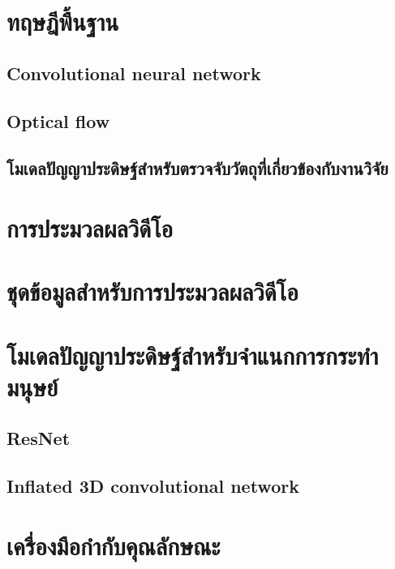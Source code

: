 \section{ทฤษฎีพื้นฐาน}
\subsection{Convolutional neural network}

\clearpage

\subsection{Optical flow}

\clearpage

\subsection{โมเดลปัญญาประดิษฐ์สำหรับตรวจจับวัตถุที่เกี่ยวข้องกับงานวิจัย}


\section{การประมวลผลวิดีโอ}

\clearpage

\section{ชุดข้อมูลสำหรับการประมวลผลวิดีโอ}

\clearpage

\section{โมเดลปัญญาประดิษฐ์สำหรับจำแนกการกระทำมนุษย์}
\subsection{ResNet}

\clearpage
\subsection{Inflated 3D convolutional network}

\clearpage

\section{เครื่องมือกำกับคุณลักษณะ}
